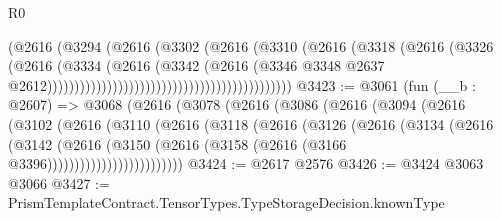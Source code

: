 \begin{lexlean}{R0}
\begin{coremodule}
                                                              (@2616
                                                                (@3294
                                                                  (@2616
                                                                    (@3302
                                                                      (@2616
                                                                        (@3310
                                                                          (@2616
                                                                            (@3318
                                                                              (@2616
                                                                                (@3326
                                                                                  (@2616
                                                                                    (@3334
                                                                                      (@2616
                                                                                        (@3342
                                                                                          (@2616
                                                                                            (@3346
                                                                                              @3348
                                                                                              @2637
                                                                                              @2612)))))))))))))))))))))))))))))))))))))))))))))
@3423 := @3061
    (fun (__b : @2607) =>
    @3068
      (@2616
        (@3078
          (@2616
            (@3086
              (@2616
                (@3094
                  (@2616
                    (@3102
                      (@2616
                        (@3110
                          (@2616
                            (@3118
                              (@2616
                                (@3126
                                  (@2616
                                    (@3134
                                      (@2616
                                        (@3142
                                          (@2616
                                            (@3150
                                              (@2616
                                                (@3158 (@2616 (@3166 @3396)))))))))))))))))))))))))
@3424 := @2617 @2576
@3426 := @3424 @3063 @3066
@3427 := PrismTemplateContract.TensorTypes.TypeStorageDecision.knownType

\end{coremodule}
\end{lexlean}
